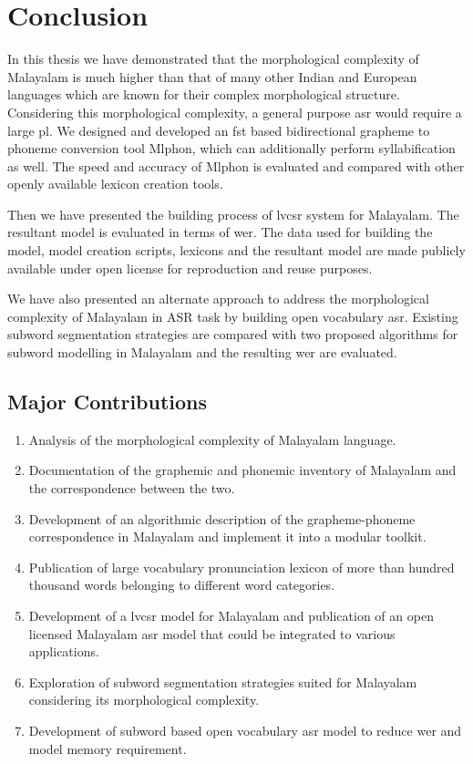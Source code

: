 \chapter{Conclusion}
\label{ch:conclusion} %
% 

In this thesis we have demonstrated that the morphological complexity of
Malayalam is much higher than that of many other Indian and European languages
which are known for their complex morphological structure. Considering this
morphological complexity, a general purpose \gls{asr} would require a large
\gls{pl}. We designed and developed an \gls{fst} based bidirectional
grapheme to phoneme conversion tool Mlphon, which can additionally perform
syllabification as well. The speed and accuracy of Mlphon is evaluated and
compared with other openly available lexicon creation tools.

Then we have presented the building process of \gls{lvcsr} system for
Malayalam. The resultant model is evaluated in terms of \gls{wer}. The data
used for building the model, model creation scripts, lexicons and the resultant
model are made publicly available under open license for reproduction and reuse
purposes.

We have also presented an alternate approach to address the morphological
complexity of Malayalam in ASR task by building open vocabulary \gls{asr}.
Existing subword segmentation strategies are compared with two proposed
algorithms for subword modelling in Malayalam and the resulting \gls{wer} are
evaluated.

\section{Major Contributions}

\begin{enumerate}
    \item Analysis of the morphological complexity of Malayalam language.
    \item Documentation of the graphemic and phonemic inventory of Malayalam and the
          correspondence between the two.
    \item  Development of an algorithmic description of the grapheme-phoneme
          correspondence in Malayalam and implement it into a modular toolkit.
    \item  Publication of large vocabulary pronunciation lexicon of more than hundred thousand words belonging to different word categories.
    \item Development of a \gls{lvcsr} model for Malayalam and publication of an open
          licensed Malayalam \gls{asr} model that could be integrated to various
          applications.
    \item Exploration of subword segmentation strategies suited for Malayalam considering
          its morphological complexity.
    \item  Development of subword based open vocabulary \gls{asr} model to reduce
          \gls{wer} and model memory requirement.
\end{enumerate}

